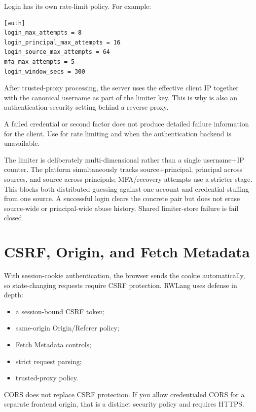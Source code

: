 Login has its own rate-limit policy. For example:

\begin{lstlisting}
[auth]
login_max_attempts = 8
login_principal_max_attempts = 16
login_source_max_attempts = 64
mfa_max_attempts = 5
login_window_secs = 300
\end{lstlisting}

After trusted-proxy processing, the server uses the effective client IP together with the canonical username as part of the limiter key. This is why  is also an authentication-security setting behind a reverse proxy.

A failed credential or second factor does not produce detailed failure information for the client. Use  for rate limiting and  when the authentication backend is unavailable.

The limiter is deliberately multi-dimensional rather than a single username+IP counter. The platform simultaneously tracks source+principal, principal across sources, and source across principals; MFA/recovery attempts use a stricter stage. This blocks both distributed guessing against one account and credential stuffing from one source. A successful login clears the concrete pair but does not erase source-wide or principal-wide abuse history. Shared limiter-store failure is fail closed.

\section{CSRF, Origin, and Fetch Metadata}

With session-cookie authentication, the browser sends the cookie automatically, so state-changing requests require CSRF protection. RWLang uses defense in depth:

\begin{itemize}
  \item a session-bound CSRF token;
  \item same-origin Origin/Referer policy;
  \item Fetch Metadata controls;
  \item strict request parsing;
  \item trusted-proxy policy.
\end{itemize}

CORS does not replace CSRF protection. If you allow credentialed CORS for a separate frontend origin, that is a distinct security policy and requires HTTPS.


